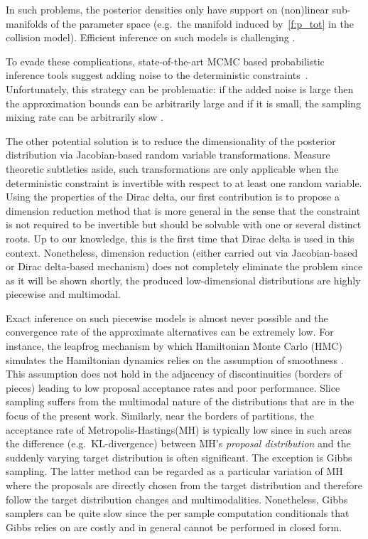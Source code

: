 In such problems, the posterior densities only have support on (non)linear sub-manifolds of the parameter space (e.g.\ the manifold induced by~\eqref{f:p_tot} in the collision model). 
Efficient inference on such models is challenging \cite{pennec2006intrinsic}. 

To evade these complications, state-of-the-art MCMC based probabilistic inference tools suggest adding noise to the deterministic constraints~\cite{wood2014new}. 
Unfortunately, this strategy can be problematic: if the added noise is large then the approximation bounds can be arbitrarily large and if it is small, the sampling mixing rate can be arbitrarily slow \cite{li2013dynamic,chin1987bayesian}. 
 
The other potential solution is to reduce the dimensionality of the posterior distribution via Jacobian-based random variable transformations. Measure theoretic subtleties aside, such transformations are only applicable when the deterministic constraint is invertible with respect to at least one random variable. Using the properties of the Dirac delta, our first contribution is to propose a dimension reduction method that is more general in the sense that the constraint is not required to be invertible but should be solvable with one or several distinct roots. Up to our knowledge, this is the first time that Dirac delta is used in this context.
Nonetheless, dimension reduction (either carried out via Jacobian-based or Dirac delta-based mechanism) does not completely eliminate the problem since as it will be shown shortly, the produced low-dimensional distributions are highly piecewise and multimodal. 

Exact inference on such piecewise models is almost never possible and the convergence rate of the approximate alternatives can be extremely low.
For instance,
the leapfrog mechanism by which Hamiltonian Monte Carlo (HMC) simulates the Hamiltonian dynamics relies on the assumption of smoothness \cite{neal2011mcmc}.
This assumption does not hold 
 in the adjacency of discontinuities (borders of pieces) leading to low proposal acceptance rates and poor performance. 
Slice sampling suffers from the multimodal nature of the distributions that are in the focus of  the present work. Similarly, near the borders of partitions, the acceptance rate of Metropolis-Hastings(MH) is typically low since in such areas the difference (e.g.\ KL-divergence) between MH’s \emph{proposal distribution} and the suddenly varying target distribution is often significant.
The exception is Gibbs sampling. The latter method can be regarded as a particular variation of MH where the proposals are directly chosen from the target distribution and therefore follow the target distribution changes and multimodalities.
Nonetheless, Gibbs samplers can be quite slow since the per sample computation conditionals that Gibbs relies on are costly and in general cannot be performed in closed form.    

